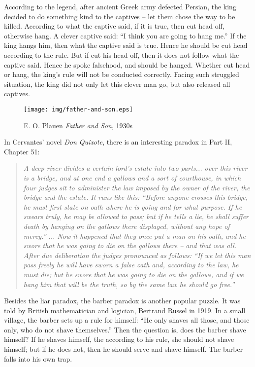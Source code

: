 \documentclass{article}
\begin{document}
According to the legend, after ancient Greek army defected Persian, the king decided to do something kind to the captives -- let them chose the way to be killed. According to what the captive said, if it is true, then cut head off, otherwise hang. A clever captive said: ``I think you are going to hang me.'' If the king hangs him, then what the captive said is true. Hence he should be cut head according to the rule. But if cut his head off, then it does not follow what the captive said. Hence he spoke falsehood, and should be hanged. Whether cut head or hang, the king's rule will not be conducted correctly. Facing such struggled situation, the king did not only let this clever man go, but also released all captives.

\begin{wrapfigure}{L}{0.5\textwidth}
 \centering
 \texttt{[image: img/father-and-son.eps]}
 \captionsetup{labelformat=empty}
 \caption{E. O. Plauen {\em Father and Son}, 1930s}
 \label{fig:father-and-son}
\end{wrapfigure}

In Cervantes' novel {\em Don Quixote}, there is an interesting paradox in Part II, Chapter 51:

\begin{quotation}
\itshape
A deep river divides a certain lord’s estate into two parts... over this river is a bridge, and at one end a gallows and a sort of courthouse, in which four judges sit to administer the law imposed by the owner of the river, the bridge and the estate. It runs like this: ``Before anyone crosses this bridge, he must first state on oath where he is going and for what purpose. If he swears truly, he may be allowed to pass; but if he tells a lie, he shall suffer death by hanging on the gallows there displayed, without any hope of mercy.'' ... Now it happened that they once put a man on his oath, and he swore that he was going to die on the gallows there -- and that was all. After due deliberation the judges pronounced as follows: ``If we let this man pass freely he will have sworn a false oath and, according to the law, he must die; but he swore that he was going to die on the gallows, and if we hang him that will be the truth, so by the same law he should go free.''
\end{quotation}

Besides the liar paradox, the barber paradox is another popular puzzle. It was told by British mathematician and logician, Bertrand Russel in 1919. In a small village, the barber sets up a rule for himself: ``He only shaves all those, and those only, who do not shave themselves.'' Then the question is, does the barber shave himself? If he shaves himself, the according to his rule, she should not shave himself; but if he does not, then he should serve and shave himself. The barber falls into his own trap.
\end{document}
